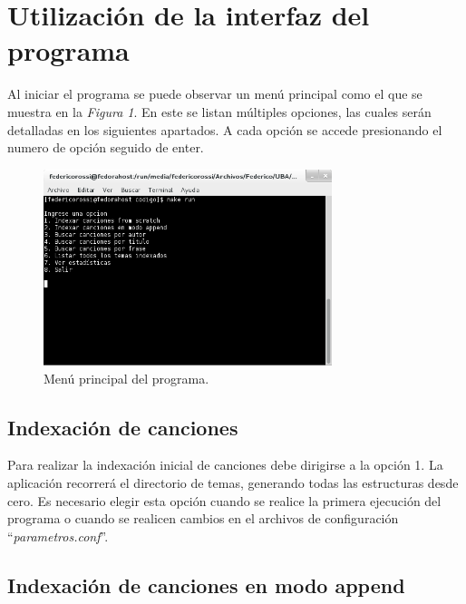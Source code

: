 \documentclass{article}
\begin{document}
\section{Utilización de la interfaz del programa}

	Al iniciar el programa se puede observar un menú principal como el que se muestra en la \textit{Figura 1}. En este se listan múltiples opciones, las cuales serán detalladas en los siguientes apartados. A cada opción se accede presionando el numero de opción seguido de enter.
	\bigskip

\begin{figure}[h]
	\centering
	\includegraphics[width=0.75\textwidth]{images/menu.png}
	\medskip
	\caption{Menú principal del programa.}
\end{figure}
\bigskip\smallskip



\subsection{Indexación de canciones}

	Para realizar la indexación inicial de canciones debe dirigirse a la opción 1. La aplicación recorrerá el directorio de temas, generando todas las estructuras desde cero. Es necesario elegir esta opción cuando se realice la primera ejecución del programa o cuando se realicen cambios en el archivos de configuración ``\textit{parametros.conf}''.
\bigskip



\subsection{Indexación de canciones en modo append}
\end{document}
